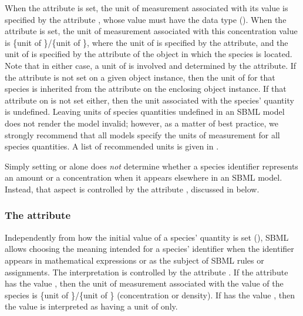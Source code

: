 When the attribute  is set, the unit of
measurement associated with its value is specified by the \Species
attribute , whose value must have the data
type  ().  When
the  attribute is set, the unit of
measurement associated with this concentration value is \{unit of
\}/\{unit of \}, where the unit
of  is specified by the \Species
{} attribute, and the unit of
 is specified by the  attribute of
the \Compartment object in which the species is located.  Note
that in either case, a unit of  is involved and
determined by the  attribute.  If the
 attribute is not set on a given \Species
object instance, then the unit of  for that
species is inherited from the  attribute on
the enclosing \Model object instance.  If that attribute on \Model
is not set either, then the unit associated with the species'
quantity is undefined.  Leaving units of species quantities
undefined in an SBML model does not render the model invalid;
however, as a matter of best practice, we strongly recommend that
all models specify the units of measurement for all species
quantities.  A list of recommended units is given in
.

Simply setting  or
 alone does \emph{not} determine
whether a species identifier represents an amount or a
concentration when it appears elsewhere in an SBML model.
Instead, that aspect is controlled by the attribute
, discussed in
 below.


\subsubsection{The  attribute}
\label{sec:species-units}

Independently from how the initial value of a species' quantity is
set (), SBML allows
choosing the meaning intended for a species' identifier when the
identifier appears in mathematical expressions or as the subject
of SBML rules or assignments.  The interpretation is controlled by
the attribute .  If the attribute has
the value , then the unit of measurement associated
with the value of the species is \{unit of
\}/\{unit of \} (\ie concentration
or density).  If  has the value
, then the value is interpreted as having a unit of
 only.

